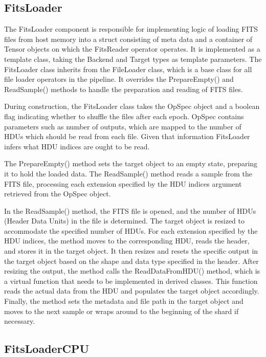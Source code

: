 \documentclass[licencjacka,en]{pracamgr}
\begin{document}
\subsection{FitsLoader}

The FitsLoader component is responsible for implementing logic of loading FITS files from host memory into a struct consisting of meta data and a container of Tensor objects on which the FitsReader operator operates. It is implemented as a template class, taking the Backend and Target types as template parameters. The FitsLoader class inherits from the FileLoader class, which is a base class for all file loader operators in the pipeline. It overrides the PrepareEmpty() and ReadSample() methods to handle the preparation and reading of FITS files.

During construction, the FitsLoader class takes the OpSpec object and a boolean flag indicating whether to shuffle the files after each epoch. OpSpec contains parameters such as number of outputs, which are mapped to the number of HDUs which should be read from each file.  Given that information FitsLoader infers what HDU indices are ought to be read. 

The PrepareEmpty() method sets the target object to an empty state, preparing it to hold the loaded data. The ReadSample() method reads a sample from the FITS file, processing each extension specified by the HDU indices argument retrieved from the OpSpec object.

In the ReadSample() method, the FITS file is opened, and the number of HDUs (Header Data Units) in the file is determined. The target object is resized to accommodate the specified number of HDUs. For each extension specified by the HDU indices, the method moves to the corresponding HDU, reads the header, and stores it in the target object. It then resizes and resets the specific output in the target object based on the shape and data type specified in the header. After resizing the output, the method calls the ReadDataFromHDU() method, which is a virtual function that needs to be implemented in derived classes. This function reads the actual data from the HDU and populates the target object accordingly. Finally, the method sets the metadata and file path in the target object and moves to the next sample or wraps around to the beginning of the shard if necessary.

\subsection{FitsLoaderCPU}
\end{document}
